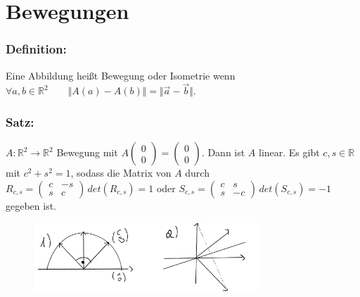 \section{Bewegungen}
%
%
%
\subsubsection{Definition:}
Eine Abbildung heißt Bewegung oder Isometrie wenn $\forall a,b \in \mathbb{R}^{2}\qquad \Vert A(a) - A(b) \Vert = \Vert \vec{a}-\vec{b}\Vert$.
%
%
%
\subsubsection{Satz:}
$A: \mathbb{R}^{2} \rightarrow \mathbb{R}^{2}$ Bewegung mit $A\begin{pmatrix} 0 \\ 0 \end{pmatrix} = \begin{pmatrix} 0 \\ 0 \end{pmatrix}$. Dann ist $A$ linear. Es gibt $c,s \in \mathbb{R}$ mit $c^{2}+s^{2}=1$, sodass die Matrix von $A$ durch $R_{c,s} = \begin{pmatrix} c & -s \\ s & c \end{pmatrix} \, det(R_{c,s}) = 1$ oder $S_{c,s} = \begin{pmatrix} c & s \\ s & -c \end{pmatrix} \, det(S_{c,s}) = -1$ gegeben ist.
%
\begin{figure}[H]
\centering
\includegraphics[width=0.75\textwidth]{mainmatter/chapter1/pics/bewegung.png}
\end{figure}
%
